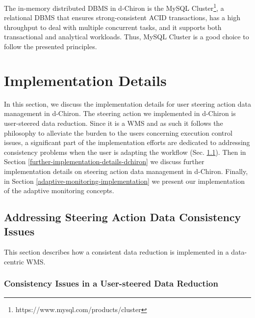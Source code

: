 The in-memory distributed DBMS in d-Chiron is the MySQL Cluster\footnote{https://www.mysql.com/products/cluster}, a relational DBMS that ensures strong-consistent ACID transactions, has a high throughput to deal with multiple concurrent tasks, and it supports both transactional and analytical workloads. Thus, MySQL Cluster is a good choice to follow the presented principles.

\section{Implementation Details}
\label{d-chiron-implentation}

In this section, we discuss the implementation details for user steering action data management in d-Chiron.
The steering action we implemented in d-Chiron is user-steered data reduction.
Since it is a WMS and as such it follows the
philosophy to alleviate the burden to the users concerning
execution control issues, a significant part of the implementation efforts are dedicated to addressing consistency problems when the
user is adapting the workflow (Sec. \ref{consistency-issues}).
Then in Section \ref{further-implementation-details-dchiron} we discuss further implementation details on steering action data management in d-Chiron. Finally, in Section \ref{adaptive-monitoring-implementation} we present our implementation of the adaptive monitoring concepts.


\subsection{Addressing Steering Action Data Consistency Issues}
\label{consistency-issues}

This section describes how a consistent data reduction is implemented in a data-centric WMS.


\subsubsection{Consistency Issues in a User-steered Data Reduction}

